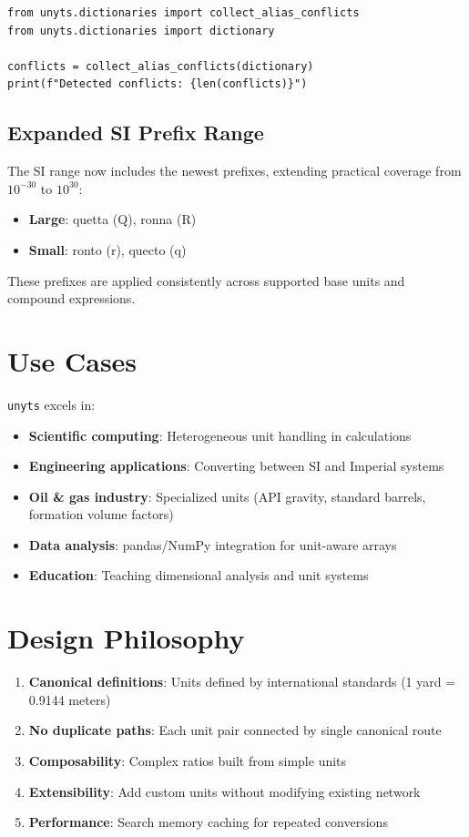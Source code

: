 \documentclass[11pt,a4paper]{report}
\begin{document}
\begin{lstlisting}[style=pythonstyle, caption={Inspecting alias conflicts}]
from unyts.dictionaries import collect_alias_conflicts
from unyts.dictionaries import dictionary

conflicts = collect_alias_conflicts(dictionary)
print(f"Detected conflicts: {len(conflicts)}")
\end{lstlisting}

\subsection{Expanded SI Prefix Range}
The SI range now includes the newest prefixes, extending practical coverage from $10^{-30}$ to $10^{30}$:
\begin{itemize}[leftmargin=*]
  \item \textbf{Large}: quetta (Q), ronna (R)
  \item \textbf{Small}: ronto (r), quecto (q)
\end{itemize}

These prefixes are applied consistently across supported base units and compound expressions.

\section{Use Cases}

\texttt{unyts} excels in:
\begin{itemize}[leftmargin=*]
  \item \textbf{Scientific computing}: Heterogeneous unit handling in calculations
  \item \textbf{Engineering applications}: Converting between SI and Imperial systems
  \item \textbf{Oil \& gas industry}: Specialized units (API gravity, standard barrels, formation volume factors)
  \item \textbf{Data analysis}: pandas/NumPy integration for unit-aware arrays
  \item \textbf{Education}: Teaching dimensional analysis and unit systems
\end{itemize}

\section{Design Philosophy}

\begin{enumerate}[leftmargin=*]
  \item \textbf{Canonical definitions}: Units defined by international standards (1 yard = 0.9144 meters)
  \item \textbf{No duplicate paths}: Each unit pair connected by single canonical route
  \item \textbf{Composability}: Complex ratios built from simple units
  \item \textbf{Extensibility}: Add custom units without modifying existing network
  \item \textbf{Performance}: Search memory caching for repeated conversions
\end{enumerate}
\end{document}
